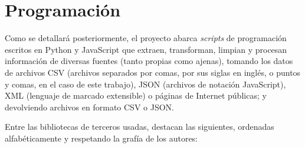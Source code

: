\section{Programación}

Como se detallará posteriormente, el proyecto abarca \textit{scripts} de programación escritos en Python y JavaScript que extraen, transforman, limpian y procesan información de diversas fuentes (tanto propias como ajenas), tomando los datos de archivos CSV (archivos separados por comas, por sus siglas en inglés, o puntos y comas, en el caso de este trabajo), JSON (archivos de notación JavaScript), XML (lenguaje de marcado extensible) o páginas de Internet públicas; y devolviendo archivos en formato CSV o JSON.

Entre las bibliotecas de terceros usadas, destacan las siguientes, ordenadas alfabéticamente y respetando la grafía de los autores:

